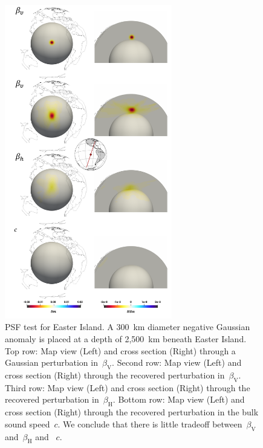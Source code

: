 \documentclass[extra,mreferee]{gji}
\begin{document}
\begin{figure}
  \centering
  \includegraphics[width=0.65\textwidth]{figures/psf/easter.pdf}
  \caption{\small{PSF test for Easter Island.
  A 300~km diameter negative Gaussian anomaly is placed at a depth of 2,500~km beneath Easter Island.
  Top row: Map view (Left) and cross section (Right) through a Gaussian perturbation in~$\beta_\mathrm{V}$.
  Second row: Map view (Left) and cross section (Right) through the recovered perturbation in~$\beta_\mathrm{V}$.
  Third row: Map view (Left) and cross section (Right) through the recovered perturbation in~$\beta_\mathrm{H}$.
  Bottom row: Map view (Left) and cross section (Right) through the recovered perturbation in the bulk sound speed~$c$. We conclude that there is little tradeoff between~$\beta_\mathrm{V}$ and~$\beta_\mathrm{H}$ and ~$c$.}}
  \label{fig:psf_easter}
\end{figure}
\end{document}
